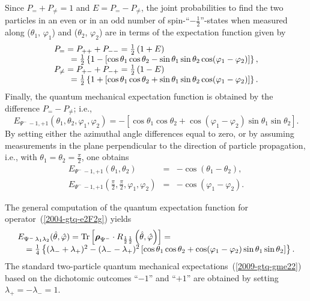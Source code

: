 {Since $P_= + P_{\neq} = 1$ and $E= P_= - P_{\neq}$, the joint probabilities to find the two particles
in an even or in an odd number of
spin-``$-\frac{1}{2}$''-states when measured along
($\theta_1$, $\varphi_1 $) and
($\theta_2$, $\varphi_2 $)
are in terms of the expectation function given by
\begin{equation}
\begin{array}{l}
P_= = P_{++}+P_{--} =
{1\over2}\left(1 + E  \right)   \\
\qquad =\frac{1}{2} \left\{ 1- \left[\cos \theta_1 \cos \theta_2 - \sin \theta_1 \sin \theta_2 \cos (\varphi_1-\varphi_2) \right]\right\}
,
\\
P_{\neq} = P_{+-}+P_{-+} =
{1\over2}\left(1 - E \right)  \\
\qquad =\frac{1}{2} \left\{ 1+ \left[\cos \theta_1 \cos \theta_2 + \sin \theta_1 \sin \theta_2 \cos (\varphi_1-\varphi_2) \right]\right\}
.
\end{array}
\end{equation}
Finally, the quantum mechanical expectation function is obtained by  the difference $P_= -P_{\neq }$; i.e.,
\begin{equation}
E_{{ {\Psi^-}}\,-1,+1  }(\theta_1,\theta_2,\varphi_1 , \varphi_2)=
-\left[\cos \theta_1 \cos \theta_2 + \cos (\varphi_1 - \varphi_2) \sin \theta_1 \sin \theta_2\right]
.
\label{2009-gtq-gme22}
\end{equation}
By setting either the azimuthal angle differences equal to zero,
or by assuming measurements in the plane perpendicular to the direction of particle propagation,
i.e., with $\theta_1=\theta_2 =\frac{\pi}{2}$,
one obtains
\begin{equation}
\label{2009-gtq-edosgc}
\begin{array}{rcl}
E_{{ {\Psi^-}}\,-1,+1  }(\theta_1,\theta_2)&=& -\cos (\theta_1 - \theta_2),\\
E_{{ {\Psi^-}}\,-1,+1  }(\frac{\pi}{2},\frac{\pi}{2},\varphi_1 , \varphi_2) &=& - \cos (\varphi_1 - \varphi_2).
\end{array}
\end{equation}


The general computation of the quantum expectation function for operator~(\ref{2004-gtq-e2F2g})
yields
\begin{equation}
\begin{array}{l}
E_{{ {\Psi^-}}\,\lambda_1 \lambda_2 } ({\hat \theta},{\hat \varphi} )=
{\rm Tr}\left[{\boldsymbol{\rho}}_{ {\Psi^-}} \cdot R_{\frac{1}{2}\frac{1}{2} } \left({\hat \theta},{\hat \varphi} \right)\right] =\\
\quad  =
\frac{1}{4} \left\{( \lambda_- + \lambda_+ )^2-( \lambda_- - \lambda_+ )^2 \left[\cos
    \theta_1  \cos  \theta_2 +\cos ( \varphi_1 - \varphi_2 ) \sin
    \theta_1  \sin  \theta_2 \right]\right\}.
\end{array}
\end{equation}
The standard two-particle quantum mechanical expectations~(\ref{2009-gtq-gme22}) based on the dichotomic outcomes
``$-1$''
and
``$+1$''
are obtained by setting
$  \lambda_+ = -  \lambda_- =1$.

}
